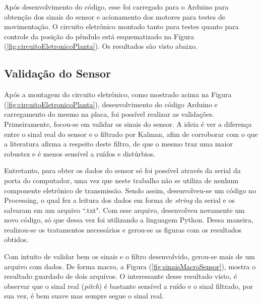 Após desenvolvimento do código, esse foi carregado para o Arduino para obtenção dos sinais do sensor e acionamento dos motores para testes de movimentação. O circuito eletrônico montado tanto para testes quanto para controle da posição do pêndulo está esquematizado na Figura (\ref{fig:circuitoEletronicoPlanta}). Os resultados são visto abaixo.

\subsection{Validação do Sensor}

Após a montagem do circuito eletrônico, como mostrado acima na Figura (\ref{fig:circuitoEletronicoPlanta}), desenvolvimento do código Arduino e carregamento do mesmo na placa, foi possível realizar as validações. Primeiramente, focou-se em validar os sinais do sensor. A ideia é ver a diferença entre o sinal real do sensor e o filtrado por Kalman, afim de corroborar com o que a literatura afirma a respeito deste filtro, de que o mesmo traz uma maior robustez e é menos sensível a ruídos e distúrbios.

Entretanto, para obter os dados do sensor só foi possível através da serial da porta do computador, uma vez que neste trabalho não se utiliza de nenhum componente eletrônico de transmissão. Sendo assim, desenvolveu-se um código no Processing, o qual fez a leitura dos dados em forma de \textit{string} da serial e os salvaram em um arquivo ``.txt". Com esse arquivo, desenvolveu novamente um novo código, só que dessa vez foi utilizando a linguagem Python. Dessa maneira, realizou-se os tratamentos necessários e gerou-se as figuras com os resultados obtidos.

Com intuito de validar bem os sinais e o filtro desenvolvido, gerou-se mais de um arquivo com dados. De forma macro, a Figura (\ref{fig:sinaisMacroSensor}), mostra o resultado guardado de dois arquivos. O interessante desse resultado visto, é observar que o sinal real (\textit{pitch}) é bastante sensível a ruído e o sinal filtrado, por sua vez, é bem suave mas sempre segue o sinal real.

